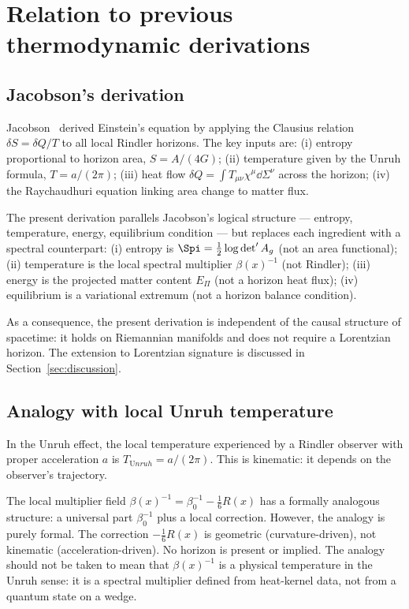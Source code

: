 \section{Relation to previous thermodynamic derivations}
  \label{sec:relation-jacobson}

  \subsection{Jacobson's derivation}
    \label{subsec:jacobson}

    Jacobson~\cite{Jacobson1995} derived Einstein's equation by applying the
    Clausius relation $\delta S = \delta Q / T$ to all local Rindler horizons.
    The key inputs are:
    (i) entropy proportional to horizon area, $S = A/(4G)$;
    (ii) temperature given by the Unruh formula, $T = a/(2\pi)$;
    (iii) heat flow $\delta Q = \int T_{\mu\nu}\chi^\mu\dd\Sigma^\nu$ across the horizon;
    (iv) the Raychaudhuri equation linking area change to matter flux.

    The present derivation parallels Jacobson's logical structure --- entropy, temperature,
    energy, equilibrium condition --- but replaces each ingredient with a spectral
    counterpart:
    (i) entropy is $\Spi = \frac{1}{2}\log\det' A_g$ (not an area functional);
    (ii) temperature is the local spectral multiplier $\beta(x)^{-1}$ (not Rindler);
    (iii) energy is the projected matter content $E_\Pi$ (not a horizon heat flux);
    (iv) equilibrium is a variational extremum (not a horizon balance condition).

    As a consequence, the present derivation is independent of the causal structure of
    spacetime: it holds on Riemannian manifolds and does not require a Lorentzian
    horizon.
    The extension to Lorentzian signature is discussed in Section~\ref{sec:discussion}.

  \subsection{Analogy with local Unruh temperature}
    \label{subsec:unruh-analogy}

    In the Unruh effect, the local temperature experienced by a Rindler observer with
    proper acceleration $a$ is $T_{\mathrm Unruh} = a/(2\pi)$.
    This is kinematic: it depends on the observer's trajectory.

    The local multiplier field $\beta(x)^{-1} = \beta_0^{-1} - \frac{1}{6}R(x)$
    has a formally analogous structure: a universal part $\beta_0^{-1}$ plus a local
    correction.
    However, the analogy is purely formal.
    The correction $-\frac{1}{6}R(x)$ is geometric (curvature-driven), not kinematic
    (acceleration-driven).
    No horizon is present or implied.
    The analogy should not be taken to mean that $\beta(x)^{-1}$ is a physical
    temperature in the Unruh sense: it is a spectral multiplier defined from
    heat-kernel data, not from a quantum state on a wedge.


